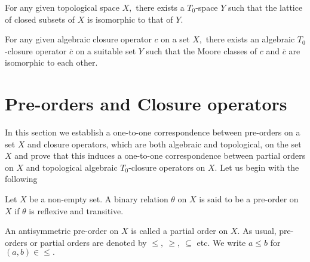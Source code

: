 \documentclass[
11pt,%
tightenlines,%
twoside,%
onecolumn,%
nofloats,%
nobibnotes,%
nofootinbib,%
superscriptaddress,%
noshowpacs,%
centertags]%
{revtex4}
\begin{document}
\begin{corollary}
\label{ch4sec3:cor9} For any given topological space $X,$ there
exists a $T_0$-space $Y$ such  that the lattice of closed subsets of
$X$ is isomorphic to that of $Y.$
\end{corollary}

\begin{corollary}
\label{ch4sec3:cor10} For any given algebraic closure operator $c$
on a set $X,$  there exists  an algebraic $T_0$-closure operator
$\overline{c}$ on a suitable set $Y$ such that the Moore classes of
$c$ and $\overline{c}$ are isomorphic to each other.
\end{corollary}

\section{Pre-orders and Closure operators}\label{ch4:sec4}
In this section we establish a one-to-one correspondence between
pre-orders  on a set $X$ and closure operators, which are both
algebraic and topological, on the set $X$ and prove that this
induces a one-to-one correspondence between partial orders on $X$
and topological algebraic $T_0$-closure operators on $X.$ Let us
begin with the following

\begin{definition}
\label{ch4sec4:def1} Let $X$ be a non-empty set. A binary relation
$\theta$ on $X$ is  said to be a pre-order on $X$ if $\theta$ is
reflexive and transitive.
\end{definition}

An antisymmetric pre-order on $X$ is called a partial order on $X.$
As usual, pre-orders or partial orders are denoted by $\leq, ~\geq,
~ \subseteq$ etc.  We write $a \leq b$ for $(a,b) \in \leq.$
\end{document}
